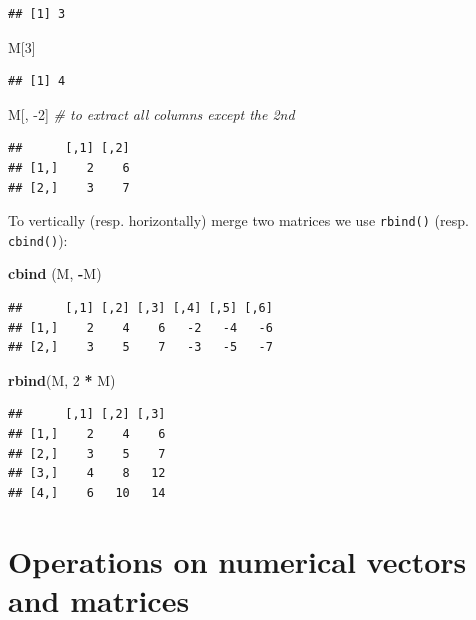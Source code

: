 \documentclass[]{book}
\newenvironment{Shaded}{\begin{snugshade}}{\end{snugshade}}
\newcommand{\CommentTok}[1]{\textcolor[rgb]{0.56,0.35,0.01}{\textit{#1}}}
\newcommand{\DecValTok}[1]{\textcolor[rgb]{0.00,0.00,0.81}{#1}}
\newcommand{\KeywordTok}[1]{\textcolor[rgb]{0.13,0.29,0.53}{\textbf{#1}}}
\newcommand{\NormalTok}[1]{#1}
\newcommand{\OperatorTok}[1]{\textcolor[rgb]{0.81,0.36,0.00}{\textbf{#1}}}
\newcommand{\StringTok}[1]{\textcolor[rgb]{0.31,0.60,0.02}{#1}}
\begin{document}
\begin{verbatim}
## [1] 3
\end{verbatim}

\begin{Shaded}
\begin{Highlighting}[]
\NormalTok{M[}\DecValTok{3}\NormalTok{]}
\end{Highlighting}
\end{Shaded}

\begin{verbatim}
## [1] 4
\end{verbatim}

\begin{Shaded}
\begin{Highlighting}[]
\NormalTok{M[, }\DecValTok{-2}\NormalTok{] }\CommentTok{# to extract all columns except the 2nd}
\end{Highlighting}
\end{Shaded}

\begin{verbatim}
##      [,1] [,2]
## [1,]    2    6
## [2,]    3    7
\end{verbatim}

To vertically (resp. horizontally) merge two matrices we use \texttt{rbind()} (resp. \texttt{cbind()}):

\begin{Shaded}
\begin{Highlighting}[]
\KeywordTok{cbind}\NormalTok{ (M, }\OperatorTok{-}\NormalTok{M)}
\end{Highlighting}
\end{Shaded}

\begin{verbatim}
##      [,1] [,2] [,3] [,4] [,5] [,6]
## [1,]    2    4    6   -2   -4   -6
## [2,]    3    5    7   -3   -5   -7
\end{verbatim}

\begin{Shaded}
\begin{Highlighting}[]
\KeywordTok{rbind}\NormalTok{(M, }\DecValTok{2} \OperatorTok{*}\StringTok{ }\NormalTok{M)}
\end{Highlighting}
\end{Shaded}

\begin{verbatim}
##      [,1] [,2] [,3]
## [1,]    2    4    6
## [2,]    3    5    7
## [3,]    4    8   12
## [4,]    6   10   14
\end{verbatim}

\hypertarget{operations-on-numerical-vectors-and-matrices}{%
\section{Operations on numerical vectors and matrices}\label{operations-on-numerical-vectors-and-matrices}}
\end{document}
